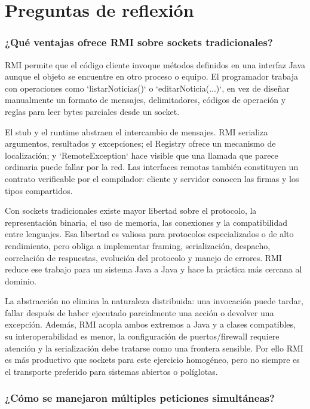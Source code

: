 
\section{Preguntas de reflexión}

\subsubsection*{¿Qué ventajas ofrece RMI sobre sockets tradicionales?}

RMI permite que el código cliente invoque métodos definidos en una interfaz Java aunque el objeto se encuentre en otro proceso o equipo. El programador trabaja con operaciones como `listarNoticias()` o `editarNoticia(...)`, en vez de diseñar manualmente un formato de mensajes, delimitadores, códigos de operación y reglas para leer bytes parciales desde un socket.

El stub y el runtime abstraen el intercambio de mensajes. RMI serializa argumentos, resultados y excepciones; el Registry ofrece un mecanismo de localización; y `RemoteException` hace visible que una llamada que parece ordinaria puede fallar por la red. Las interfaces remotas también constituyen un contrato verificable por el compilador: cliente y servidor conocen las firmas y los tipos compartidos.

Con sockets tradicionales existe mayor libertad sobre el protocolo, la representación binaria, el uso de memoria, las conexiones y la compatibilidad entre lenguajes. Esa libertad es valiosa para protocolos especializados o de alto rendimiento, pero obliga a implementar framing, serialización, despacho, correlación de respuestas, evolución del protocolo y manejo de errores. RMI reduce ese trabajo para un sistema Java a Java y hace la práctica más cercana al dominio.

La abstracción no elimina la naturaleza distribuida: una invocación puede tardar, fallar después de haber ejecutado parcialmente una acción o devolver una excepción. Además, RMI acopla ambos extremos a Java y a clases compatibles, su interoperabilidad es menor, la configuración de puertos/firewall requiere atención y la serialización debe tratarse como una frontera sensible. Por ello RMI es más productivo que sockets para este ejercicio homogéneo, pero no siempre es el transporte preferido para sistemas abiertos o políglotas.

\subsubsection*{¿Cómo se manejaron múltiples peticiones simultáneas?}

